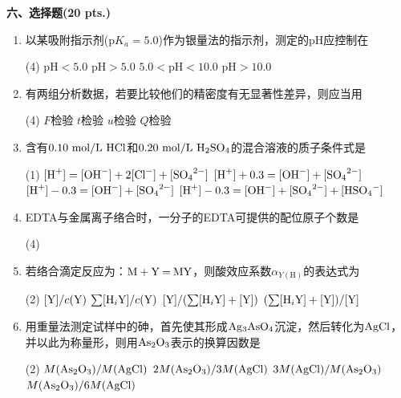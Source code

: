 \vspace{0.5cm}
\noindent\textbf{六、选择题(20 pts.)}

\begin{enumerate}[label=\arabic*., itemsep=1.5ex]
    \item 以某吸附指示剂($\text{p}K_a=5.0$)作为银量法的指示剂，测定的pH应控制在
    \begin{tasks}(4)
        \task $\text{pH}<5.0$
        \task $\text{pH}>5.0$
        \task $5.0<\text{pH}<10.0$
        \task $\text{pH}>10.0$
    \end{tasks}

    \item 有两组分析数据，若要比较他们的精密度有无显著性差异，则应当用
    \begin{tasks}(4)
        \task $F$检验
        \task $t$检验
        \task $u$检验
        \task $Q$检验
    \end{tasks}

    \item 含有$0.10\ \mathrm{mol/L}\ \ce{HCl}$和$0.20\ \mathrm{mol/L}\ \ce{H2SO4}$的混合溶液的质子条件式是
    \begin{tasks}(1)
        \task $[\ce{H+}]=[\ce{OH-}]+2[\ce{Cl-}]+[\ce{SO4^{2-}}]$
        \task $[\ce{H+}]+0.3=[\ce{OH-}]+[\ce{SO4^{2-}}]$
        \task $[\ce{H+}]-0.3=[\ce{OH-}]+[\ce{SO4^{2-}}]$
        \task $[\ce{H+}]-0.3=[\ce{OH-}]+[\ce{SO4^{2-}}]+[\ce{HSO4-}]$
    \end{tasks}

    \item EDTA与金属离子络合时，一分子的EDTA可提供的配位原子个数是
    \begin{tasks}(4)
    \end{tasks}

    \item 若络合滴定反应为：$\ce{M + Y = MY}$，则酸效应系数$\alpha_{Y(\text{H})}$的表达式为
    \begin{tasks}(2)
        \task $[\ce{Y}]/c(\ce{Y})$
        \task $\sum[\ce{H_iY}]/c(\ce{Y})$
        \task $[\ce{Y}]/(\sum[\ce{H_iY}]+[\ce{Y}])$
        \task $(\sum[\ce{H_iY}]+[\ce{Y}])/[\ce{Y}]$
    \end{tasks}

    \item 用重量法测定试样中的砷，首先使其形成$\ce{Ag3AsO4}$沉淀，然后转化为$\ce{AgCl}$，并以此为称量形，则用$\ce{As2O3}$表示的换算因数是
    \begin{tasks}(2)
        \task $M(\ce{As2O3})/M(\ce{AgCl})$
        \task $2M(\ce{As2O3})/3M(\ce{AgCl})$
        \task $3M(\ce{AgCl})/M(\ce{As2O3})$
        \task $M(\ce{As2O3})/6M(\ce{AgCl})$
    \end{tasks}


\end{enumerate}
